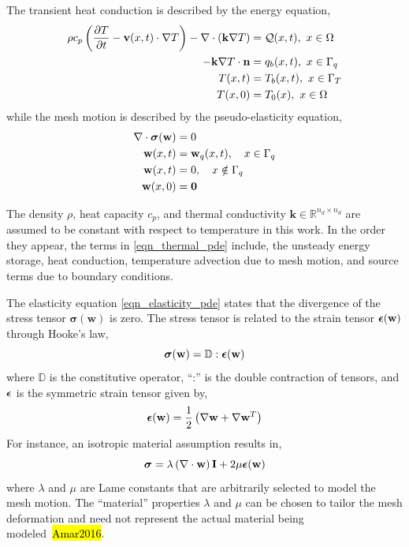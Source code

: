The transient heat conduction is described by the energy equation,
\begin{subequations}
    \begin{align}
        \rho c_p\left(\ppt{T} - \mathbf{v}(x,t)\cdot\nabla T\right) - \nabla\cdot (\mathbf{k}\nabla T) &= \cQ(x,t),\ x\in\Omega \label{eqn_thermal_pde}\\
        -\mathbf{k}\nabla T\cdot \vn &= q_b(x,t),\ x\in\Gamma_q\label{eqn_thermal_bc_neumann}\\
        T(x,t) &= T_b(x,t),\ x\in\Gamma_T\label{eqn_thermal_bc_dirichlet}\\
        T(x,0) &= T_0(x),\ x\in\Omega\label{eqn_thermal_ic}
    \end{align}\label{eqn_governing_equations}
\end{subequations}
while the mesh motion is described by the pseudo-elasticity equation,
\begin{subequations}
    \begin{align}
        \nabla\cdot\boldsymbol{\sigma}(\mathbf{w}) &= 0\label{eqn_elasticity_pde}\\
        \mathbf{w}(x,t) &= \mathbf{w}_q(x,t),\quad x\in\Gamma_q\label{eqn_displacement_heated_bc}\\
        \mathbf{w}(x,t) &= 0,\quad x\notin \Gamma_q\label{eqn_displacement_unheated_bc}\\
        \mathbf{w}(x,0) &= \boldsymbol{0}\label{eqn_displacement_initial_condition}
    \end{align}
\end{subequations}

The density $\rho$, heat capacity $c_p$, and thermal conductivity $\mathbf{k}\in\mathbb{R}^{n_d\times n_d}$ are assumed to be constant with respect to temperature in this work. In the order they appear, the terms in \cref{eqn_thermal_pde} include, the unsteady energy storage, heat conduction, temperature advection due to mesh motion, and source terms due to boundary conditions.

The elasticity equation \cref{eqn_elasticity_pde} states that the divergence of the stress tensor $\boldsymbol{\sigma}(\mathbf{w})$ is zero. The stress tensor is related to the strain tensor $\boldsymbol{\epsilon}(\mathbf{w})$ through Hooke's law,
\[
    \boldsymbol{\sigma}(\mathbf{w}) = \mathbb{D}:\boldsymbol{\epsilon}(\mathbf{w})
\]
where $\mathbb{D}$ is the constitutive operator, ``:'' is the double contraction of tensors, and $\boldsymbol{\epsilon}$ is the symmetric strain tensor given by,
\[
    \boldsymbol{\epsilon}(\mathbf{w}) = \frac{1}{2}\left(\nabla\mathbf{w} + \nabla\mathbf{w}^T\right)
\]
For instance, an isotropic material assumption results in,
\[
    \boldsymbol{\sigma} = \lambda\left(\nabla\cdot\mathbf{w}\right) \mathbf{I} + 2\mu\boldsymbol{\epsilon}(\mathbf{w})
\]
where $\lambda$ and $\mu$ are Lame constants that are arbitrarily selected to model the mesh motion. The ``material'' properties $\lambda$ and $\mu$ can be chosen to tailor the mesh deformation and need not represent the actual material being modeled~\hl{Amar2016}. 

